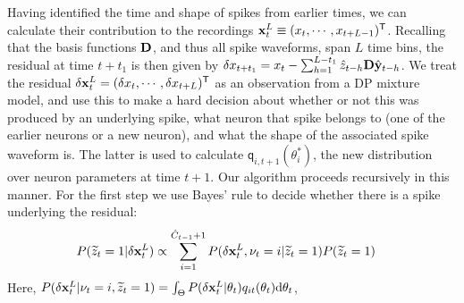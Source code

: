 Having identified the time and shape of spikes from earlier times, we can calculate their contribution to the recordings 
$\mathbf{x}^L_t \equiv (x_{t},\cdots, x_{t+L-1})^{\mathsf{T}}$.
Recalling that the basis functions $\mathbf{D}$, and thus all spike waveforms, span $L$ time bins, the residual at time $t+t_1$ is then given by
$  \delta x_{t+t_1} = x_t - \sum_{h=1}^{L-t_1} \hat{z}_{t-h} \mathbf{D}\hat{\mathbf{y}}_{t-h}$.
We treat the residual $\delta{\mathbf{x}}^L_{t} =  (\delta x_{t}, \cdots, \delta x_{t+L})^{\mathsf{T}}$ as an observation from a DP mixture model, and use this to make a hard decision about whether or not this was produced 
by an underlying spike, what neuron that spike belongs 
to (one of the earlier neurons or a new neuron), and what the shape of the associated spike waveform is. The latter is used to calculate
$\mathsf{q}_{i,t+1}(\theta^*_i)$, the new distribution over neuron parameters at time $t+1$. Our algorithm proceeds recursively in this manner. 
% 
% 
For the first step we use Bayes' rule to decide whether there is a spike underlying the residual:\vspace{-5pt}
\begin{align}
  P(\widetilde{z}_t = 1 | \delta{\mathbf{x}}^L_t)  &\propto \sum_{i = 1}^{\hat{C}_{t-1}+1} P(\delta{\mathbf{x}}^L_t, {\nu_t = i} | \widetilde{z}_t = 1) P(\widetilde{z}_t = 1) \label{eq:spk_prob}
\end{align}
Here, $ P(\delta{\mathbf{x}}^L_t | {\nu_t = i} , \widetilde{z}_t = 1) = \int_{\Theta} P(\delta{\mathbf{x}}^L_t | \theta_t) q_{it} (\theta_t) \mathrm{d} \theta_t$,
